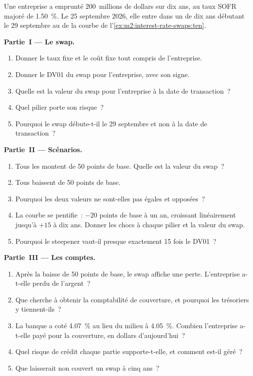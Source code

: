 \begin{problem}\label{pb:m2:interest-rate-swaps:1}
Une entreprise a emprunté 200~millions de dollars sur dix ans, au taux SOFR 
majoré de 1.50~\%. Le 25 septembre 2026, elle entre dans un  de dix ans débutant le 29
septembre au  de la courbe de l'\cref{ex:m2:interest-rate-swaps:ten}.

\medskip\noindent\textbf{Partie~I --- Le swap.}
\begin{enumerate}
\item Donner le taux fixe et le coût fixe tout compris de l'entreprise.
\item Donner le DV01 du swap pour l'entreprise, avec son signe.
\item Quelle est la valeur du swap pour l'entreprise à la date de transaction~?
\item Quel pilier porte son risque~?
\item Pourquoi le swap débute-t-il le 29 septembre et non à la date de transaction~?
\end{enumerate}

\medskip\noindent\textbf{Partie~II --- Scénarios.}
\begin{enumerate}[resume]
\item Tous les  montent de 50 points de base. Quelle est la valeur du swap~?
\item Tous baissent de 50 points de base.
\item Pourquoi les deux valeurs ne sont-elles pas égales et opposées~?
\item La courbe se pentifie~: $-20$ points de base à un an, croissant linéairement jusqu'à $+15$
à dix ans. Donner les chocs à chaque pilier et la valeur du swap.
\item Pourquoi le steepener vaut-il presque exactement 15 fois le DV01~?
\end{enumerate}

\medskip\noindent\textbf{Partie~III --- Les comptes.}
\begin{enumerate}[resume]
\item Après la baisse de 50 points de base, le swap affiche une perte. L'entreprise a-t-elle
perdu de l'argent~?
\item Que cherche à obtenir la comptabilité de couverture, et pourquoi les trésoriers y tiennent-ils~?
\item La banque a coté 4.07~\% au lieu du milieu à 4.05~\%. Combien l'entreprise a-t-elle payé
pour la couverture, en dollars d'aujourd'hui~?
\item Quel risque de crédit chaque partie supporte-t-elle, et comment est-il géré~?
\item Que laisserait non couvert un swap à cinq ans~?
\end{enumerate}


\end{problem}

